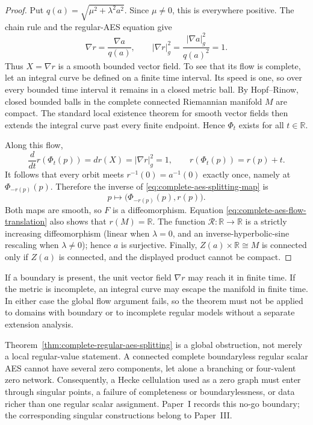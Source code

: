 \begin{proof}
Put \(q(a)=\sqrt{\mu^2+\lambda^2a^2}\).  Since \(\mu\ne0\), this is everywhere
positive.  The chain rule and the regular-AES equation give
\[
  \nabla r=\frac{\nabla a}{q(a)},
  \qquad
  |\nabla r|_g^2
    =\frac{|\nabla a|_g^2}{q(a)^2}=1.
\]
Thus \(X=\nabla r\) is a smooth bounded vector field.  To see that its flow is
complete, let an integral curve be defined on a finite time interval.  Its speed
is one, so over every bounded time interval it remains in a closed metric ball.
By Hopf--Rinow, closed bounded balls in the complete connected Riemannian
manifold \(M\) are compact.  The standard local existence theorem for smooth
vector fields then extends the integral curve past every finite endpoint.
Hence \(\Phi_t\) exists for all \(t\in\mathbb R\).

Along this flow,
\begin{equation}
  \frac{d}{dt}r(\Phi_t(p))
    =dr(X)=|\nabla r|_g^2=1,
  \qquad
  r(\Phi_t(p))=r(p)+t.
  \label{eq:complete-aes-flow-translation}
\end{equation}
It follows that every orbit meets \(r^{-1}(0)=a^{-1}(0)\) exactly once, namely
at \(\Phi_{-r(p)}(p)\).  Therefore the inverse of
\eqref{eq:complete-aes-splitting-map} is
\[
  p\longmapsto
  \bigl(\Phi_{-r(p)}(p),r(p)\bigr).
\]
Both maps are smooth, so \(F\) is a diffeomorphism.  Equation
\eqref{eq:complete-aes-flow-translation} also shows that \(r(M)=\mathbb R\).
The function \(\mathcal R:\mathbb R\to\mathbb R\) is a strictly increasing
diffeomorphism (linear when \(\lambda=0\), and an inverse-hyperbolic-sine
rescaling when \(\lambda\ne0\)); hence \(a\) is surjective.  Finally,
\(Z(a)\times\mathbb R\cong M\) is connected only if \(Z(a)\) is connected,
and the displayed product cannot be compact.
\end{proof}

\begin{remark}
\label{rem:complete-splitting-boundary-warning}
If a boundary is present, the unit vector field \(\nabla r\) may reach it in
finite time.  If the metric is incomplete, an integral curve may escape the
manifold in finite time.  In either case the global flow argument fails, so the
theorem must not be applied to domains with boundary or to incomplete regular
models without a separate extension analysis.
\end{remark}

Theorem~\ref{thm:complete-regular-aes-splitting} is a global obstruction, not
merely a local regular-value statement.  A connected complete boundaryless
regular scalar AES cannot have several zero components, let alone a branching
or four-valent zero network.  Consequently, a Hecke cellulation used as a zero
graph must enter through singular points, a failure of completeness or
boundarylessness, or data richer than one regular scalar assignment.  Paper~I
records this no-go boundary; the corresponding singular constructions belong
to Paper~III.

